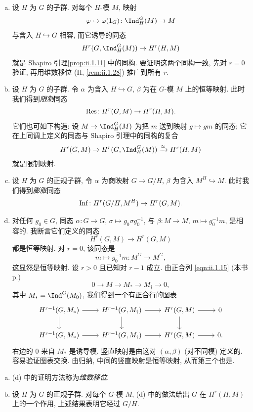 \begin{example}\label{ex:ii.1.27}
\begin{enumerate}[(a)]
\item 设 $H$ 为 $G$ 的子群. 对每个 $H$-模 $M$, 映射
\[
 \varphi\mapsto\varphi(1_G)\colon \Ind_H^G(M)\to M
\]
与含入 $H\hookrightarrow G$ 相容, 而它诱导的同态
\[
 H^r(G,\Ind_H^G(M))\to H^r(H,M)
\]
就是 Shapiro 引理\ref{prop:ii.1.11} 中的同构. 要证明这两个同构一致, 先对 $r=0$ 验证, 再用维数移位 (II, \ref{rem:ii.1.28}) 推广到所有 $r$.
\item 设 $H$ 为 $G$ 的子群. 令 $\alpha$ 为含入 $H\hookrightarrow G$, $\beta$ 为在 $G$-模 $M$ 上的恒等映射. 此时我们得到\emph{限制}同态
\[
 \operatorname{Res}\colon H^r(G,M)\to H^r(H,M).
\]
它们也可如下构造: 设 $M\to \Ind_H^G(M)$ 为把 $m$ 送到映射 $g\mapsto gm$ 的同态; 它在上同调上定义的同态与 Shapiro 引理中的同构的复合
\[
 H^r(G,M)\to H^r(G,\Ind_H^G(M))\xrightarrow{\simeq} H^r(H,M)
\]
就是限制映射.
\item 设 $H$ 为 $G$ 的正规子群, 令 $\alpha$ 为商映射 $G\to G/H$, $\beta$ 为含入 $M^H\hookrightarrow M$. 此时我们得到\emph{膨胀}同态
\[
 \operatorname{Inf}\colon H^r(G/H,M^H)\to H^r(G,M).
\]
\item 对任何 $g_0\in G$, 同态 $\alpha\colon G\to G$, $\sigma\mapsto g_0\sigma g_0^{-1}$, 与 $\beta\colon M\to M$, $m\mapsto g_0^{-1}m$, 是相容的. 我断言它们定义的同态
\[
 H^r(G,M)\to H^r(G,M)
\]
都是恒等映射. 对 $r=0$, 该同态是
\[
 m\mapsto g_0^{-1}m\colon M^G\to M^G,
\]
这显然是恒等映射. 设 $r>0$ 且已知对 $r-1$ 成立. 由正合列 \ref{eqn:ii.1.15} (本书 p.\pageref{eqn:ii.1.15})
\[
 0\to M\to M_*\to M_\dagger\to 0,
\]
其中 $M_*=\Ind^G(M_0)$, 我们得到一个有正合行的图表
\[
 \begin{tikzcd}
 H^{r-1}(G,M_*) \ar[r] \ar[d] & H^{r-1}(G,M_\dagger) \ar[r] \ar[d] & H^r(G,M) \ar[r] \ar[d] & 0 \\
 H^{r-1}(G,M_*) \ar[r] & H^{r-1}(G,M_\dagger) \ar[r] & H^r(G,M) \ar[r] & 0.
 \end{tikzcd}
\]
右边的 $0$ 来自 $M_*$ 是诱导模. 竖直映射是由这对 $(\alpha,\beta)$ (对不同模) 定义的. 容易验证图表交换. 由归纳, 中间的竖直映射是恒等映射, 从而第三个也是.
\end{enumerate}
\end{example}

\begin{remark}\label{rem:ii.1.28}
\begin{enumerate}[(a)]
\item (d) 中的证明方法称为\emph{维数移位}.
\item 设 $H$ 为 $G$ 的正规子群. 对每个 $G$-模 $M$, (d) 中的做法给出 $G$ 在 $H^r(H,M)$ 上的一个作用, 上述结果表明它经过 $G/H$.
\end{enumerate}
\end{remark}

